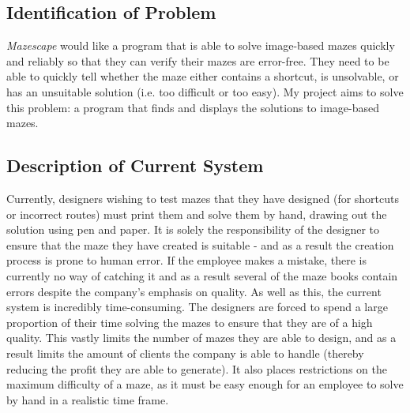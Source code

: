 \documentclass[titlepage]{article}
\begin{document}
\subsection{Identification of Problem}
\textit{Mazescape} would like a program that is able to solve image-based mazes quickly and reliably so that they can verify their mazes are error-free. They need to be able to quickly tell whether the maze either contains a shortcut, is unsolvable, or has an unsuitable solution (i.e. too difficult or too easy). My project aims to solve this problem: a program that finds and displays the solutions to image-based mazes.

\subsection{Description of Current System}
Currently, designers wishing to test mazes that they have designed (for shortcuts or incorrect routes) must print them and solve them by hand, drawing out the solution using pen and paper. It is solely the responsibility of the designer to ensure that the maze they have created is suitable - and as a result the creation process is prone to human error. If the employee makes a mistake, there is currently no way of catching it and as a result several of the maze books contain errors despite the company's emphasis on quality. As well as this, the current system is incredibly time-consuming. The designers are forced to spend a large proportion of their time solving the mazes to ensure that they are of a high quality. This vastly limits the number of mazes they are able to design, and as a result limits the amount of clients the company is able to handle (thereby reducing the profit they are able to generate). It also places restrictions on the maximum difficulty of a maze, as it must be easy enough for an employee to solve by hand in a realistic time frame.
\end{document}
